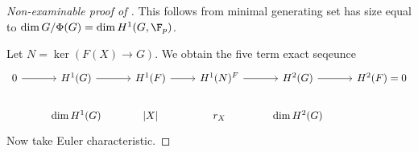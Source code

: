 \documentclass[a4paper]{article}
\begin{document}
\begin{proof}[Non-examinable proof of ]
  This follows from minimal generating set has size equal to \(\dim G/\Phi(G) = \dim H^1(G, \F_p)\).

  Let \(N = \ker(F(X) \to G)\). We obtain the five term exact seqeunce
  \[
    \begin{tikzcd}
      0 \ar[r] & H^1(G) \ar[r] & H^1(F) \ar[r] & H^1(N)^F \ar[r] & H^2(G) \ar[r] & H^2(F) = 0 \\
      & \dim H^1(G) & {|X|} & r_X & \dim H^2(G)
    \end{tikzcd}
  \]
  Now take Euler characteristic.
\end{proof}













\printindex
\end{document}
